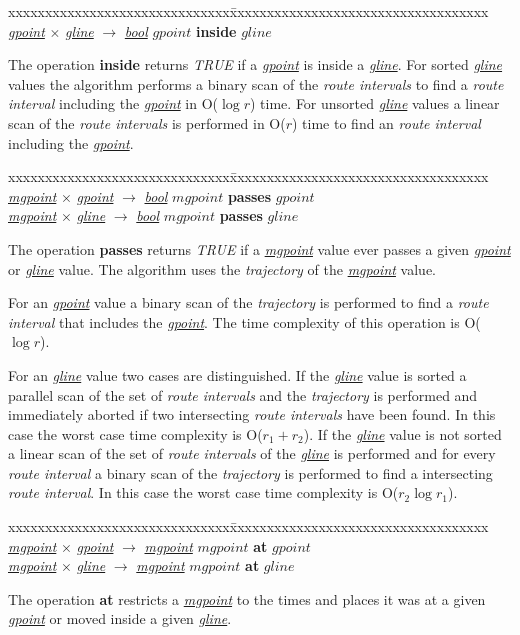 \documentclass[a4paper]{article}
\newcommand{\op}[1]{\textbf{#1}}
\newcommand{\dt}[1]{\textsl{\underline{#1}}}
\newcommand{\true}{\textsl{TRUE}}
\begin{document}
\begin{tabbing}
xxxxxxxxxxxxxxxxxxxxxxxxxxxxxx\=xxxxxxxxxxxxxxxxxxxxxxxxxxxxxxxxxxx\kill
\dt{gpoint} $\times$ \dt{gline} $\rightarrow$ \dt{bool} \> $gpoint$ \op{inside}
$gline$\\
\end{tabbing}
The operation \op{inside} returns \true{} if a \dt{gpoint} is inside a
\dt{gline}. For sorted \dt{gline} values the algorithm performs a binary
scan of the \textit{route intervals} to find a \textit{route interval} including
the \dt{gpoint} in O($\log r$) time. For unsorted \dt{gline} values a linear
scan of the \textit{route intervals} is performed in O($r$) time to find an
\textit{route interval}
including the \dt{gpoint}.
\begin{tabbing}
xxxxxxxxxxxxxxxxxxxxxxxxxxxxxx\=xxxxxxxxxxxxxxxxxxxxxxxxxxxxxxxxxxx\kill
\dt{mgpoint} $\times$ \dt{gpoint} $\rightarrow$ \dt{bool} \> $mgpoint$
\op{passes} $gpoint$\\
\dt{mgpoint} $\times$ \dt{gline} $\rightarrow$ \dt{bool} \> $mgpoint$
\op{passes} $gline$\\
\end{tabbing}
The operation \op{passes} returns \true{} if a \dt{mgpoint} value ever passes a
given \dt{gpoint} or \dt{gline} value. The algorithm uses the \textit{trajectory} of
the \dt{mgpoint} value.

For an \dt{gpoint} value a binary scan of the \textit{trajectory} is performed to find
a \textit{route interval} that includes the \dt{gpoint}. The time complexity of
this operation is O($\log r$).

For an \dt{gline} value two cases are distinguished. If the \dt{gline} value is
sorted a parallel scan of the set of
\textit{route intervals} and the \textit{trajectory} is performed and immediately
aborted if
two intersecting \textit{route intervals} have been found. In this case the
worst case
time complexity is O($r_1 + r_2$). If the \dt{gline} value is not sorted a
linear
scan of the set of \textit{route intervals} of the \dt{gline} is performed and
for
every \textit{route interval} a binary scan of the \textit{trajectory} is performed to
find
a intersecting \textit{route interval}. In this case the worst case time
complexity
is O($r_2 \log {r_1}$).
\begin{tabbing}
xxxxxxxxxxxxxxxxxxxxxxxxxxxxxx\=xxxxxxxxxxxxxxxxxxxxxxxxxxxxxxxxxxx\kill
\dt{mgpoint} $\times$ \dt{gpoint} $\rightarrow$ \dt{mgpoint} \> $mgpoint$
\op{at} $gpoint$\\
\dt{mgpoint} $\times$ \dt{gline} $\rightarrow$ \dt{mgpoint} \> $mgpoint$ \op{at}
$gline$\\
\end{tabbing}
The operation \op{at} restricts a \dt{mgpoint} to the times and places it was
at a given \dt{gpoint} or moved inside a given \dt{gline}.
\end{document}
